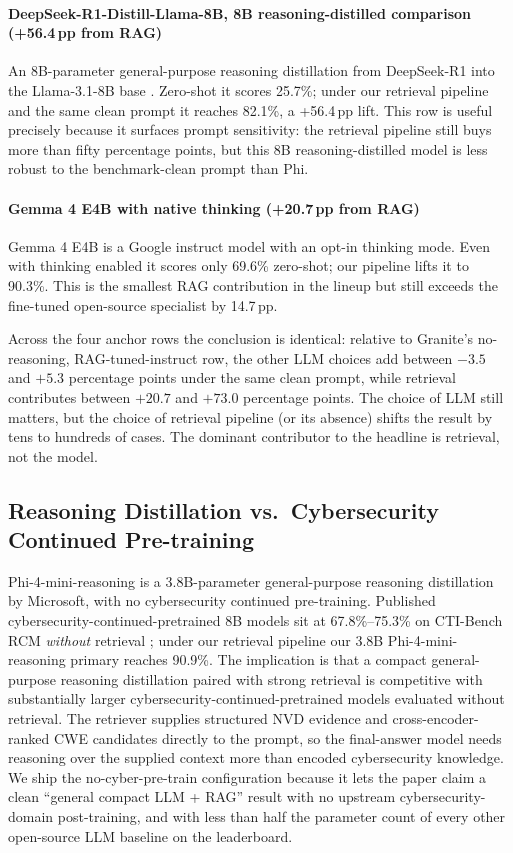 \paragraph{DeepSeek-R1-Distill-Llama-8B, 8B reasoning-distilled comparison (+56.4\,pp from RAG)} An 8B-parameter general-purpose reasoning distillation from DeepSeek-R1 into the Llama-3.1-8B base \cite{deepseek-r1-2025,llama31-2024}. Zero-shot it scores 25.7\%; under our retrieval pipeline and the same clean prompt it reaches 82.1\%, a +56.4\,pp lift. This row is useful precisely because it surfaces prompt sensitivity: the retrieval pipeline still buys more than fifty percentage points, but this 8B reasoning-distilled model is less robust to the benchmark-clean prompt than Phi.

\paragraph{Gemma 4 E4B with native thinking (+20.7\,pp from RAG)} Gemma 4 E4B is a Google instruct model with an opt-in thinking mode. Even with thinking enabled it scores only 69.6\% zero-shot; our pipeline lifts it to 90.3\%. This is the smallest RAG contribution in the lineup but still exceeds the fine-tuned open-source specialist by 14.7\,pp.

Across the four anchor rows the conclusion is identical: relative to Granite's no-reasoning, RAG-tuned-instruct row, the other LLM choices add between $-3.5$ and $+5.3$ percentage points under the same clean prompt, while retrieval contributes between $+20.7$ and $+73.0$ percentage points. The choice of LLM still matters, but the choice of retrieval pipeline (or its absence) shifts the result by tens to hundreds of cases. The dominant contributor to the headline is retrieval, not the model.

\subsection{Reasoning Distillation vs.\ Cybersecurity Continued Pre-training}
\label{sec:distill-vs-pretrain}

Phi-4-mini-reasoning is a 3.8B-parameter general-purpose reasoning distillation by Microsoft, with no cybersecurity continued pre-training. Published cybersecurity-continued-pretrained 8B models sit at 67.8\%--75.3\% on CTI-Bench RCM \emph{without} retrieval \cite{yu-2025,kassianik-2025,yang-2026}; under our retrieval pipeline our 3.8B Phi-4-mini-reasoning primary reaches 90.9\%. The implication is that a compact general-purpose reasoning distillation paired with strong retrieval is competitive with substantially larger cybersecurity-continued-pretrained models evaluated without retrieval. The retriever supplies structured NVD evidence and cross-encoder-ranked CWE candidates directly to the prompt, so the final-answer model needs reasoning over the supplied context more than encoded cybersecurity knowledge. We ship the no-cyber-pre-train configuration because it lets the paper claim a clean ``general compact LLM + RAG'' result with no upstream cybersecurity-domain post-training, and with less than half the parameter count of every other open-source LLM baseline on the leaderboard.

